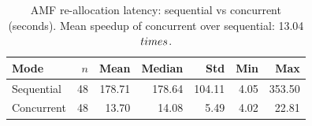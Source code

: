 \begin{table}[htbp]
\centering
\caption{AMF re-allocation latency: sequential vs concurrent (seconds). Mean speedup of concurrent over sequential: 13.04$\\times$.}
\label{tab:comparison}
\begin{tabular}{lrrrrrr}
\hline
Mode & $n$ & Mean & Median & Std & Min & Max \\
\hline
Sequential & 48 & 178.71 & 178.64 & 104.11 & 4.05 & 353.50 \\
Concurrent & 48 & 13.70 & 14.08 & 5.49 & 4.02 & 22.81 \\
\hline
\end{tabular}
\end{table}
